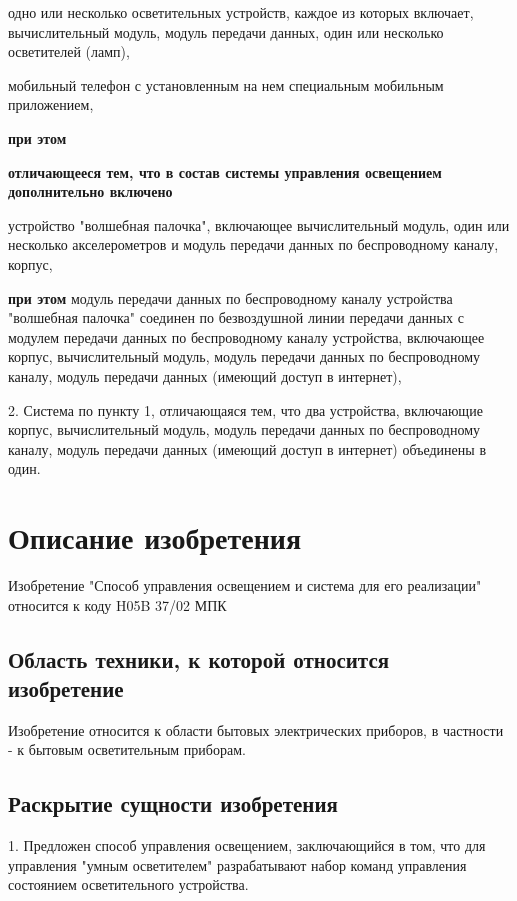 одно или несколько осветительных устройств, каждое из которых включает, вычислительный модуль, модуль передачи данных, один или несколько осветителей (ламп),


мобильный телефон с установленным на нем специальным мобильным приложением,

\textbf{при этом}



\textbf{отличающееся тем, что в состав системы управления освещением дополнительно включено}

устройство "волшебная палочка", включающее  вычислительный модуль,  один или несколько акселерометров и модуль передачи данных по беспроводному каналу, корпус,

\textbf{при этом }
модуль передачи данных по беспроводному каналу устройства "волшебная палочка" соединен по безвоздушной линии передачи данных с модулем передачи данных по беспроводному каналу устройства, включающее корпус, вычислительный модуль, модуль передачи данных по беспроводному каналу, модуль передачи данных  (имеющий доступ в интернет),

2. Система по пункту 1, отличающаяся тем, что два устройства, включающие корпус, вычислительный модуль, модуль передачи данных по беспроводному каналу, модуль передачи данных (имеющий доступ в интернет) объединены в один.


\section{Описание изобретения}

Изобретение "Способ управления освещением и система для его реализации" относится к коду H05B 37/02 МПК 

 
\subsection{Область техники, к которой относится изобретение}

Изобретение относится к области бытовых электрических приборов, в частности - к бытовым осветительным приборам.



\subsection{Раскрытие сущности изобретения}
1. Предложен способ управления освещением, заключающийся в том, что для управления "умным осветителем" разрабатывают набор команд управления состоянием осветительного устройства. 

